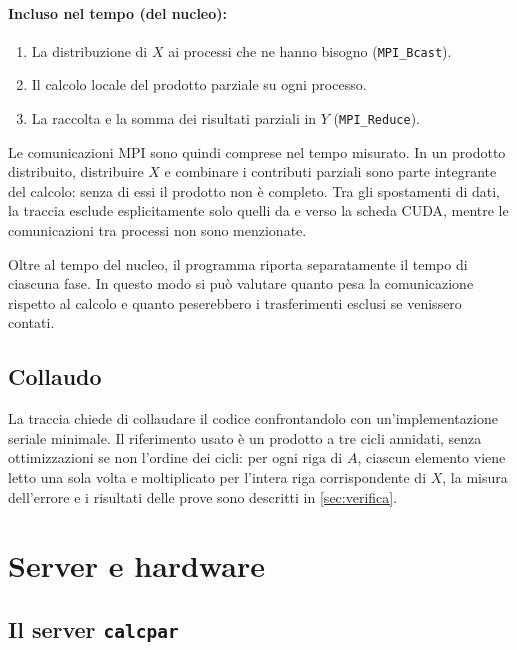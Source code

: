 \documentclass[11pt,a4paper]{article}
\begin{document}
\paragraph{Incluso nel tempo (del nucleo):}
\begin{enumerate}
  \item La distribuzione di $X$ ai processi che ne hanno bisogno
        (\texttt{MPI\_Bcast}).
  \item Il calcolo locale del prodotto parziale su ogni processo.
  \item La raccolta e la somma dei risultati parziali in $Y$
        (\texttt{MPI\_Reduce}).
\end{enumerate}

Le comunicazioni MPI sono quindi comprese nel tempo misurato. In un prodotto
distribuito, distribuire $X$ e combinare i contributi parziali sono parte
integrante del calcolo: senza di essi il prodotto non è completo. Tra gli
spostamenti di dati, la traccia esclude esplicitamente solo quelli da e verso
la scheda CUDA, mentre le comunicazioni tra processi non sono menzionate.

Oltre al tempo del nucleo, il programma riporta separatamente il tempo di
ciascuna fase. In questo modo si può valutare quanto pesa la comunicazione
rispetto al calcolo e quanto peserebbero i trasferimenti esclusi se venissero
contati.

\subsection{Collaudo}\label{sec:collaudo}

La traccia chiede di collaudare il codice confrontandolo con
un'implementazione seriale minimale. Il riferimento usato è un prodotto a tre
cicli annidati, senza ottimizzazioni se non l'ordine dei cicli: per ogni riga
di $A$, ciascun elemento viene letto una sola volta e moltiplicato per l'intera
riga corrispondente di $X$, la misura dell'errore e i risultati delle prove sono descritti in \cref{sec:verifica}.

\section{Server e hardware}\label{sec:hardware}

\subsection{Il server \texttt{calcpar}}\label{sec:calcpar}
\end{document}
